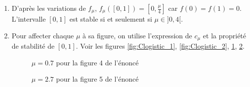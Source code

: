\begin{enumerate}
 \item D'après les variations de $f_\mu$, $f_\mu([0,1]) = \left[ 0,\frac{\mu}{4} \right]$ car $f(0) = f(1) = 0$.\newline
 L'intervalle $[0,1]$ est stable si et seulement si $\mu\in]0,4[$.
 \item Pour affecter chaque $\mu$ à sa figure, on utilise l'expression de $c_\mu$ et la propriété de stabilité de $[0,1]$. Voir les figures \ref{fig:Clogistic_1}, \ref{fig:Clogistic_2}, \ref{fig:Clogistic_3}, \ref{fig:Clogistic_4}. 
\begin{figure}[ht]
 \centering
 
 \caption{$\mu=0.7$ pour la figure 4 de l'énoncé}
 \label{fig:Clogistic_3}
\end{figure}
\begin{figure}[ht]
 \centering
 
 \caption{$\mu=2.7$ pour la figure 5 de l'énoncé}
 \label{fig:Clogistic_4}
\end{figure}

\end{enumerate}

